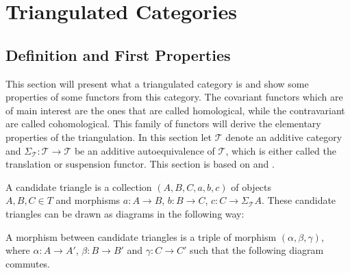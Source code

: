 \chapter{Triangulated Categories}

\section{Definition and First Properties}
    This section will present what a triangulated category is and show some properties of some functors from this category. The covariant functors which are of main interest are the ones that are called homological, while the contravariant are called cohomological. This family of functors will derive the elementary properties of the triangulation. In this section let $\mathcal{T}$ denote an additive category and $\Sigma_{\mathcal{T}}:\mathcal{T}\rightarrow\mathcal{T}$ be an additive autoequivalence of $\mathcal{T}$, which is either called the translation or suspension functor. This section is based on \cite{happel} and \cite{neeman}.
    
    \begin{definition}
        A candidate triangle is a collection $(A,B,C,a,b,c)$ of objects \\ $A,B,C\in T$ and morphisms $a:A\rightarrow B$, $b:B\rightarrow C$, $c:C\rightarrow \Sigma_{\mathcal{T}}A$. These candidate triangles can be drawn as diagrams in the following way:

        \begin{center}
        \end{center}

        A morphism between candidate triangles is a triple of morphism $(\alpha, \beta, \gamma)$, where $\alpha : A \rightarrow A'$, $\beta : B \rightarrow B'$ and $\gamma : C \rightarrow C'$ such that the following diagram commutes.

    \begin{center}
    \end{center}

    \end{definition}

